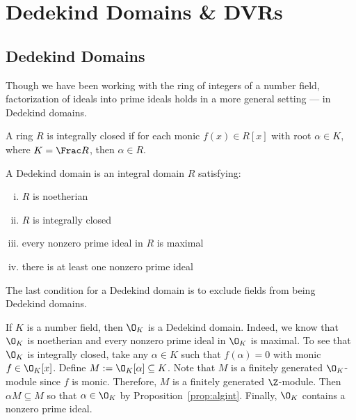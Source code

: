 
\section{Dedekind Domains \& DVRs}
\subsection{Dedekind Domains}

Though we have been working with the ring of integers of a number field, factorization of ideals into prime ideals holds in a more general setting --- in Dedekind domains. 

\begin{dfn}
A ring $R$ is integrally closed if for each monic $f(x) \in R[x]$ with root $\alpha \in K$, where $K=\Frac R$, then $\alpha \in R$.
\end{dfn}

\begin{dfn}
A Dedekind domain is an integral domain $R$ satisfying:
	\begin{enumerate}[(i)]
	\item $R$ is noetherian
	\item $R$ is integrally closed
	\item every nonzero prime ideal in $R$ is maximal
	\item there is at least one nonzero prime ideal
	\end{enumerate}
\end{dfn}

\begin{rem}
The last condition for a Dedekind domain is to exclude fields from being Dedekind domains. 
\end{rem}

\begin{ex}
If $K$ is a number field, then $\O_K$ is a Dedekind domain. Indeed, we know that $\O_K$ is noetherian and every nonzero prime ideal in $\O_K$ is maximal. To see that $\O_K$ is integrally closed, take any $\alpha \in K$ such that $f(\alpha)=0$ with monic $f \in \O_K[x]$. Define $M:=\O_K[\alpha] \subseteq K$. Note that $M$ is a finitely generated $\O_K$-module since $f$ is monic. Therefore, $M$ is a finitely generated $\Z$-module. Then $\alpha M \subseteq M$ so that $\alpha \in \O_K$ by Proposition~\ref{prop:algint}. Finally, $\O_K$ contains a nonzero prime ideal. \xqed
\end{ex}

